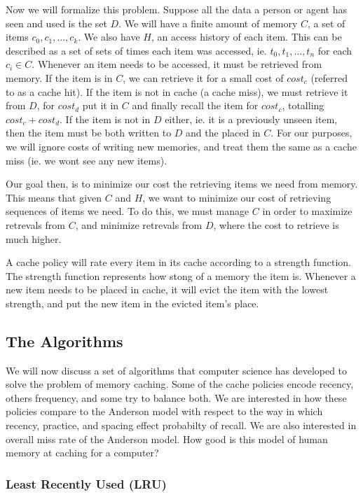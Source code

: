 \documentclass[10pt,letterpaper]{article}
\begin{document}
Now we will formalize this problem. Suppose all the data a person or agent has seen and used is the set $D$.
We will have a finite amount of memory $C$, a set of items ${c_0, c_1, ..., c_k}$. We also have $H$, 
an access history of each item. This can be described as a set of sets of times each item was accessed, ie.
${t_0, t_1, ..., t_n}$ for each $c_i \in C$. Whenever an item needs to be accessed,
it must be retrieved from memory. If the item is in $C$, we can retrieve it for a small cost of
$cost_{c}$ (referred to as a cache hit). If the item is not in cache (a cache miss), we must retrieve it from $D$, for $cost_d$
put it in $C$ and finally recall the item for $cost_c$, totalling $cost_c + cost_d$. If the item is not in $D$ either, ie. it is
a previously unseen item, then the item must be both written to $D$ and the placed in $C$. For our purposes, we will ignore
costs of writing new memories, and treat them the same as a cache miss (ie. we wont see any new items).

Our goal then, is to minimize our cost the retrieving items we need from memory.
This means that given $C$ and $H$, we want to minimize our cost
of retrieving sequences of items we need. To do this, we must manage $C$ in order to
maximize retrevals from $C$, and minimize retrevals from $D$, where the cost to retrieve is much higher. 

A cache policy will rate every item in its cache according to a strength
function. The strength function represents how stong of a memory
the item is. Whenever a new item needs to be placed in cache, 
it will evict the item with the lowest strength, and put the new item in the
evicted item's place. 

\subsection{The Algorithms}

We will now discuss a set of algorithms that computer science has developed to
solve the problem of memory caching. Some of the cache policies encode recency,
others frequency, and some try to balance both. We are interested in how
these policies compare to the Anderson model with respect to the way in which
recency, practice, and spacing effect probabilty of recall. We are also interested
in overall miss rate of the Anderson model. How good is this model of human memory at caching
for a computer?


\subsubsection{Least Recently Used (LRU)}
\end{document}
